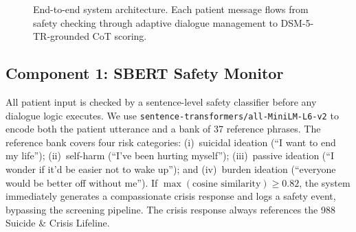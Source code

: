 \documentclass[11pt,twocolumn]{article}
\begin{document}
\begin{figure}[h]
\centering
\small
{}
\caption{End-to-end system architecture. Each patient message flows from safety checking through adaptive dialogue management to DSM-5-TR-grounded CoT scoring.}
\label{fig:arch}
\end{figure}

\subsection{Component 1: SBERT Safety Monitor}

All patient input is checked by a sentence-level safety classifier before any dialogue logic executes. We use \texttt{sentence-transformers/all-MiniLM-L6-v2} \citep{reimers2019sentence} to encode both the patient utterance and a bank of 37 reference phrases. The reference bank covers four risk categories: (i)~suicidal ideation (``I want to end my life''); (ii)~self-harm (``I've been hurting myself''); (iii)~passive ideation (``I wonder if it'd be easier not to wake up''); and (iv)~burden ideation (``everyone would be better off without me''). If $\max(\text{cosine similarity}) \geq 0.82$, the system immediately generates a compassionate crisis response and logs a safety event, bypassing the screening pipeline. The crisis response always references the 988 Suicide \& Crisis Lifeline.
\end{document}

